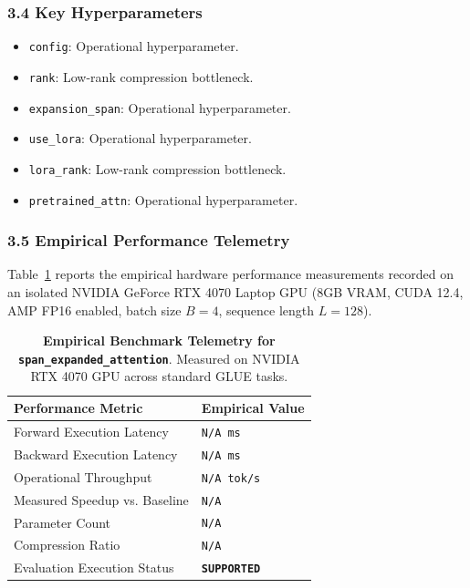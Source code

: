 \subsubsection*{3.4 Key Hyperparameters}
\begin{itemize}
    \item \texttt{config}: Operational hyperparameter.
    \item \texttt{rank}: Low-rank compression bottleneck.
    \item \texttt{expansion\_span}: Operational hyperparameter.
    \item \texttt{use\_lora}: Operational hyperparameter.
    \item \texttt{lora\_rank}: Low-rank compression bottleneck.
    \item \texttt{pretrained\_attn}: Operational hyperparameter.
\end{itemize}

\subsubsection*{3.5 Empirical Performance Telemetry}
Table~\ref{tab:telemetry_span_expanded_attention} reports the empirical hardware performance measurements recorded on an isolated NVIDIA GeForce RTX 4070 Laptop GPU (8GB VRAM, CUDA 12.4, AMP FP16 enabled, batch size $B=4$, sequence length $L=128$).

\begin{table}[h]
\centering
\small
\caption{\textbf{Empirical Benchmark Telemetry for \texttt{span\_expanded\_attention}}. Measured on NVIDIA RTX 4070 GPU across standard GLUE tasks.}
\label{tab:telemetry_span_expanded_attention}
\begin{tabularx}{\columnwidth}{lX}
\toprule
\textbf{Performance Metric} & \textbf{Empirical Value} \\
\midrule
Forward Execution Latency & \texttt{N/A ms} \\
Backward Execution Latency & \texttt{N/A ms} \\
Operational Throughput & \texttt{N/A tok/s} \\
Measured Speedup vs. Baseline & \texttt{N/A} \\
Parameter Count & \texttt{N/A} \\
Compression Ratio & \texttt{N/A} \\
Evaluation Execution Status & \textbf{\texttt{SUPPORTED}} \\
\bottomrule
\end{tabularx}
\end{table}

